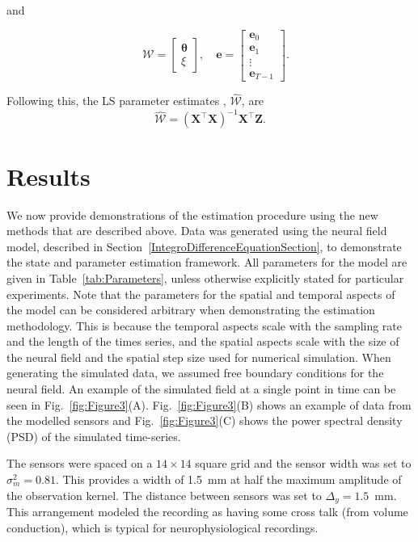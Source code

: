 \documentclass[review,authoryear,3p]{elsarticle}
\newcommand{\parham}[1]{\textcolor{blue}{#1}}
\begin{document}
and
\begin{small}
\begin{equation*}
\quad \mathcal W=\left[
	\begin{array}{cc}
		\boldsymbol{\theta} \\
		\xi
	\end{array}
	\right],\quad \mathbf{e}=\left[
	\begin{array}{cccc}
		\mathbf e_0\\
		\mathbf e_1\\
		\vdots\\
		\mathbf e_{T-1}
	\end{array}
	\right].
\end{equation*}
\end{small}
Following this, the LS parameter estimates \parham{\citep{Ljung1999}}, $ \hat{\mathcal{W}}$, are
\begin{equation}
	\hat{\mathcal{W}}=(\mathbf X^\top\mathbf X)^{-1}\mathbf X^\top\mathbf Z. 
\end{equation}

\section{Results}\label{ResultsSection} We now provide demonstrations of the estimation procedure using the new methods that are described above. Data was generated using the neural field model, described in Section~\ref{IntegroDifferenceEquationSection}, to demonstrate the state and parameter estimation framework. All parameters for the model are given in Table~\ref{tab:Parameters}, unless otherwise explicitly stated for particular experiments. Note that the parameters for the spatial and temporal aspects of the model can be considered arbitrary when demonstrating the estimation methodology. This is because the temporal aspects scale with the sampling rate and the length of the times series, and the spatial aspects scale with the size of the neural field and the spatial step size used for numerical simulation. When generating the simulated data, we assumed free boundary conditions for the neural field. An example of the simulated field at a single point in time can be seen in Fig.~\ref{fig:Figure3}(A). Fig.~\ref{fig:Figure3}(B) shows an example of data from the modelled sensors and Fig.~\ref{fig:Figure3}(C) shows the power spectral density (PSD) of the simulated time-series. %

The sensors were spaced on a $14 \times 14$ square grid and the sensor width was set to $\sigma^2_m = 0.81$. This provides a width of 1.5~mm at half the maximum amplitude of the observation kernel. The distance between sensors was set to $\Delta_y = 1.5$~mm. This arrangement modeled the recording as having some cross talk (from volume conduction), which is typical for neurophysiological recordings.
\end{document}
